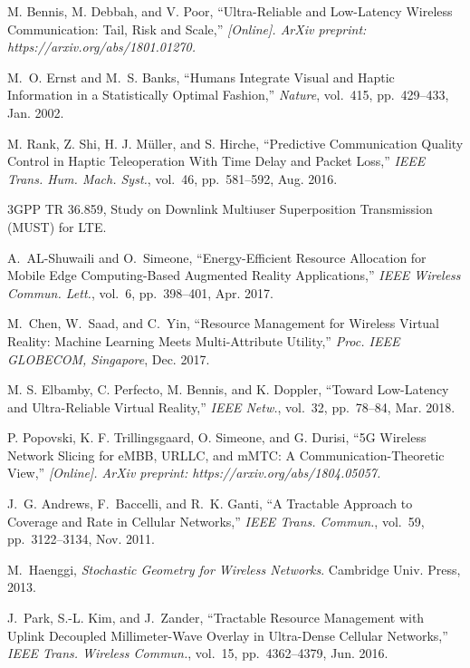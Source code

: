 \documentclass[conference]{IEEEtran}
\begin{document}
\begin{thebibliography}{10}
{M. Bennis, M. Debbah, and V. Poor}, ``{Ultra-Reliable and Low-Latency Wireless
  Communication: Tail, Risk and Scale},'' {\em \emph{[Online]}. ArXiv preprint:
  https://arxiv.org/abs/1801.01270.}

M.~O. Ernst and M.~S. Banks, ``{Humans Integrate Visual and Haptic Information
  in a Statistically Optimal Fashion},'' {\em Nature}, vol.~415, pp.~429--433,
  Jan. 2002.

{M. Rank, Z. Shi, H. J. M{\"u}ller, and S. Hirche}, ``{Predictive Communication
  Quality Control in Haptic Teleoperation With Time Delay and Packet Loss},''
  {\em IEEE Trans. Hum. Mach. Syst.}, vol.~46, pp.~581--592, Aug. 2016.

{3GPP TR 36.859, Study on Downlink Multiuser Superposition Transmission (MUST)
  for LTE.}

A.~AL-Shuwaili and O.~Simeone, ``{Energy-Efficient Resource Allocation for
  Mobile Edge Computing-Based Augmented Reality Applications},'' {\em IEEE
  Wireless Commun. Lett.}, vol.~6, pp.~398--401, Apr. 2017.

M.~Chen, W.~Saad, and C.~Yin, ``{Resource Management for Wireless Virtual
  Reality: Machine Learning Meets Multi-Attribute Utility},'' {\em Proc. IEEE
  GLOBECOM, Singapore}, Dec. 2017.

{M. S. Elbamby, C. Perfecto, M. Bennis, and K. Doppler}, ``{Toward Low-Latency
  and Ultra-Reliable Virtual Reality},'' {\em IEEE Netw.}, vol.~32, pp.~78--84,
  Mar. 2018.

{P. Popovski, K. F. Trillingsgaard, O. Simeone, and G. Durisi}, ``{5G Wireless
  Network Slicing for eMBB, URLLC, and mMTC: A Communication-Theoretic View},''
  {\em \emph{[Online]}. ArXiv preprint: https://arxiv.org/abs/1804.05057.}

J.~G. Andrews, F.~Baccelli, and R.~K. Ganti, ``{A Tractable Approach to
  Coverage and Rate in Cellular Networks},'' {\em IEEE Trans. Commun.},
  vol.~59, pp.~3122--3134, Nov. 2011.

M.~Haenggi, {\em {Stochastic Geometry for Wireless Networks}}.
\newblock Cambridge Univ. Press, 2013.

J.~Park, S.-L. Kim, and J.~Zander, ``{Tractable Resource Management with Uplink
  Decoupled Millimeter-Wave Overlay in Ultra-Dense Cellular Networks},'' {\em
  IEEE Trans. Wireless Commun.}, vol.~15, pp.~4362--4379, Jun. 2016.


\end{thebibliography}
\end{document}
